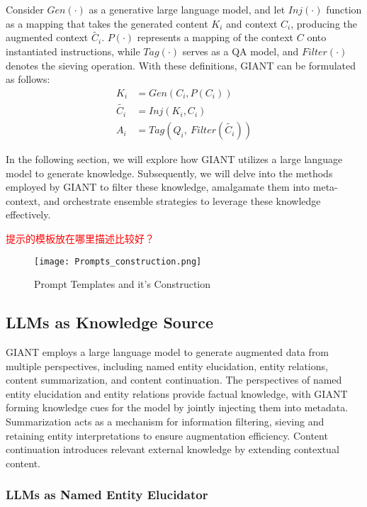  Consider $Gen(\cdot)$ as a generative large language model, and let $Inj(\cdot)$ function as a mapping that takes the generated content $K_i$ and context $C_i$, producing the augmented context $\tilde{C_i}$. $P(\cdot)$ represents a mapping of the context $C$ onto instantiated instructions, while $Tag(\cdot)$ serves as a QA model, and $Filter(\cdot)$ denotes the sieving operation.
 With these definitions, GIANT can be formulated as follows:
 \begin{align*}
 	K_i &= Gen(C_i,P(C_i)) \tag{1}\\
 	\tilde{C_i} &= Inj(K_i,C_i) \tag{2}\\
 	A_i &= Tag(Q_i,~Filter(\tilde{C_i})) \tag{3}
 \end{align*}
 
 
 In the following section, we will explore how GIANT utilizes a large language model to generate knowledge. Subsequently, we will delve into the methods employed by GIANT to filter these knowledge, amalgamate them into meta-context, and orchestrate ensemble strategies to leverage these knowledge effectively.

\textcolor{red}{提示的模板放在哪里描述比较好？}
\label{sec:prompt_construction}
\begin{figure*}[h]
	\centering
	\texttt{[image: Prompts\_construction.png]}
	\caption{Prompt Templates and it's Construction}
	\label{fig:prompt_template}
\end{figure*}   

\subsection{LLMs as Knowledge Source}
 GIANT employs a large language model to generate augmented data from multiple perspectives, including named entity elucidation, entity relations, content summarization, and content continuation.
 The perspectives of named entity elucidation and entity relations provide factual knowledge, with GIANT forming knowledge cues for the model by jointly injecting them into metadata. 
 Summarization acts as a mechanism for information filtering, sieving and retaining entity interpretations to ensure augmentation efficiency. 
 Content continuation introduces relevant external knowledge by extending contextual content.


\subsubsection{LLMs as Named Entity Elucidator}

